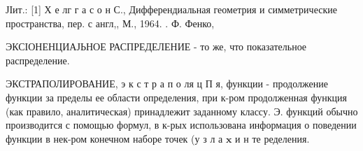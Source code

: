 \documentclass[10pt]{article}
\begin{document}
ЈІит.: [1] Х е лг г а с о н С., Дифферендиальная геометрия и симметрические пространства, пер. с англ,, М., 1964. . Ф. Фенко,



ЭКСІОНЕНЦИАЈЬНОЕ РАСПРЕДЕЛЕНИЕ - то же, что показательное распределение.



ЭКСТРАПОЛИРОВАНИЕ, э к с т р а п о ля ц П я, функции - продолжение функции за пределы ее области определения, при к-ром продолженная функция (как правило, аналитическая) принадлежит заданному классу. Э. функций обычно производится с помощью формул, в к-рых использована информация о поведении функции в нек-ром конечном наборе точек (у з л а $\mathbf{x}$ и н те ределения.
\end{document}
